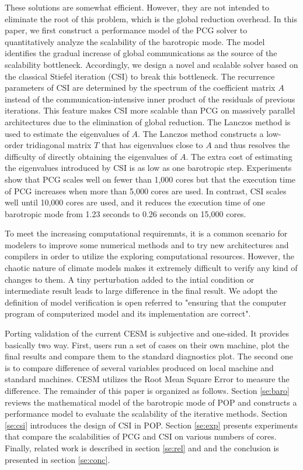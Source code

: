 \documentclass{sig-alternate}
\begin{document}
These solutions are somewhat efficient. However, they are not intended to eliminate the root of this problem, which is the global reduction overhead. In this paper, we first construct a performance model of the PCG solver to quantitatively analyze the scalability of the barotropic mode. The model identifies the gradual increase of global communications as the source of the scalability bottleneck. Accordingly, we design a novel and scalable solver based on the classical Stiefel iteration (CSI) to break this bottleneck. The recurrence parameters of CSI are determined by the spectrum of the coefficient matrix $A$ instead of the communication-intensive inner product of the residuals of previous iterations. This feature makes CSI more scalable than PCG on massively parallel architectures due to the elimination of global reduction. The Lanczos method is used to estimate the eigenvalues of $A$. The Lanczos method constructs a low-order tridiagonal matrix $T$ that has eigenvalues close to $A$ and thus resolves the difficulty of directly obtaining the eigenvalues of $A$. The extra cost of estimating the eigenvalues introduced by CSI is as low as one barotropic step. Experiments show that PCG scales well on fewer than 1,000 cores but that the execution time of PCG increases when more than 5,000 cores are used. In contrast, CSI scales well until 10,000 cores are used, and it reduces the execution time of one barotropic mode from 1.23 seconds to 0.26 seconds on 15,000 cores.

To meet the increasing computational requiremnts, it is a common scenario for modelers to improve some numerical methods and to try new architectures and compilers in order to utilize the exploring computational resources. 
However, the chaotic nature of climate models makes it extremely difficult to verify any kind of changes to them. A tiny perturbation added to the intial condition or intermediate result leads to large difference in the final result.
We adopt the definition of model verification is open referred to "ensuring that the computer program of computerized model and its implementation are correct"\cite{sargent2005verification}.


Porting validation of the current CESM is subjective and one-sided\cite{vertenstein2011cesm1}. It provides basically two way. First, users run a set of cases on their own machine, plot the final results and compare them to the standard diagnostics plot. The second one is to compare difference of several variables produced on local machine and standard machines. CESM utilizes the Root Mean Square Error to measure the difference. 
The remainder of this paper is organized as follows. Section \ref{se:baro} reviews the mathematical model of the barotropic mode of POP and constructs a performance model to evaluate the scalability of the iterative methods. Section \ref{se:csi} introduces the design of CSI in POP. Section \ref{se:exp} presents experiments that compare the scalabilities of PCG and CSI on various numbers of cores. Finally, related work is described in section \ref{se:rel} and and the conclusion is presented in section \ref{se:conc}.
\end{document}
